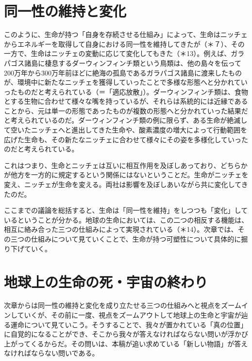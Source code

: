 \documentclass[8pt, a5paper]{ltjsarticle}
\begin{document}
\section{同一性の維持と変化}\label{ux540cux4e00ux6027ux306eux7dadux6301ux3068ux5909ux5316}

このように、生命が持つ「自身を存続させる仕組み」によって、生命はニッチェからエネルギーを取得して自身における同一性を維持してきたが（＊７）、その一方で、生命はニッチェの変動に応じて変化してもきた（＊13）。例えば、ガラパゴス諸島に棲息するダーウィンフィンチ類という鳥類は、他の島々を伝って200万年から300万年前ほどに絶海の孤島であるガラパゴス諸島に渡来したものが、環境中に新たなニッチェを獲得していったことで多様な形態へと分かれていったものだと考えられている（＝「適応放散」）。ダーウィンフィンチ類は、食物とする生物に合わせて様々な嘴を持っているが、それらは系統的には近縁であることから、元は単一の形態であったものが複数の形態へと分かれていった結果だと考えられているのだ。ダーウィンフィンチ類の例に限らず、ある生命が絶滅して空いたニッチェへと進出してきた生命や、酸素濃度の増大によって行動範囲を広げた生命も、その新たなニッチェに合わせて様々にその姿を多様化していったのだと考えられている。

これはつまり、生命とニッチェは互いに相互作用を及ぼしあっており、どちらかが他方を一方的に規定するという関係にはないということだ。生命がニッチェを変え、ニッチェが生命を変える。両社は影響を及ぼしあいながら共に変化してきたのだ。

ここまでの議論を総括すると、生命は「同一性を維持」をしつつも「変化」しているということが分かる。地球の生命においては、この二つの相反する機能は、相互に絡み合った三つの仕組みによって実現されている（＊14）。次章では、その三つの仕組みについて見ていくことで、生命が持つ可塑性について具体的に掘り下げていく。

\section{地球上の生命の死・宇宙の終わり}\label{ux5730ux7403ux4e0aux306eux751fux547dux306eux6b7bux5b87ux5b99ux306eux7d42ux308fux308a}

次章からは同一性の維持と変化を成り立たせる三つの仕組みへと視点をズームインしていくが、その前に一度、視点をズームアウトして地球上の生命と宇宙が辿る運命について見ていこう。そうすることで、我々が置かれている「真の位置」に自覚的になることができ、そこから我々が答えなければならない問いが浮かび上がってくるからだ。その問いは、本稿が追い求めている「新しい物語」が答えなければならない問いである。
\end{document}
